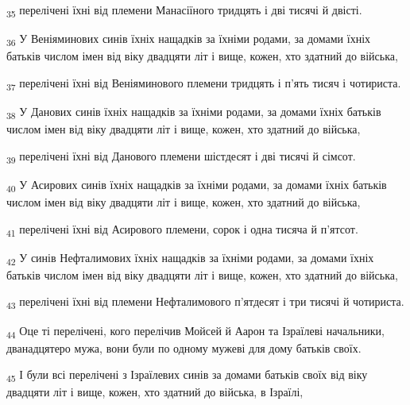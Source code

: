\begin{tcolorbox}
\textsubscript{35} перелічені їхні від племени Манасіїного тридцять і дві тисячі й двісті.
\end{tcolorbox}
\begin{tcolorbox}
\textsubscript{36} У Веніяминових синів їхніх нащадків за їхніми родами, за домами їхніх батьків числом імен від віку двадцяти літ і вище, кожен, хто здатний до війська,
\end{tcolorbox}
\begin{tcolorbox}
\textsubscript{37} перелічені їхні від Веніяминового племени тридцять і п'ять тисяч і чотириста.
\end{tcolorbox}
\begin{tcolorbox}
\textsubscript{38} У Данових синів їхніх нащадків за їхніми родами, за домами їхніх батьків числом імен від віку двадцяти літ і вище, кожен, хто здатний до війська,
\end{tcolorbox}
\begin{tcolorbox}
\textsubscript{39} перелічені їхні від Данового племени шістдесят і дві тисячі й сімсот.
\end{tcolorbox}
\begin{tcolorbox}
\textsubscript{40} У Асирових синів їхніх нащадків за їхніми родами, за домами їхніх батьків числом імен від віку двадцяти літ і вище, кожен, хто здатний до війська,
\end{tcolorbox}
\begin{tcolorbox}
\textsubscript{41} перелічені їхні від Асирового племени, сорок і одна тисяча й п'ятсот.
\end{tcolorbox}
\begin{tcolorbox}
\textsubscript{42} У синів Нефталимових їхніх нащадків за їхніми родами, за домами їхніх батьків числом імен від віку двадцяти літ і вище, кожен, хто здатний до війська,
\end{tcolorbox}
\begin{tcolorbox}
\textsubscript{43} перелічені їхні від племени Нефталимового п'ятдесят і три тисячі й чотириста.
\end{tcolorbox}
\begin{tcolorbox}
\textsubscript{44} Оце ті перелічені, кого перелічив Мойсей й Аарон та Ізраїлеві начальники, дванадцятеро мужа, вони були по одному мужеві для дому батьків своїх.
\end{tcolorbox}
\begin{tcolorbox}
\textsubscript{45} І були всі перелічені з Ізраїлевих синів за домами батьків своїх від віку двадцяти літ і вище, кожен, хто здатний до війська, в Ізраїлі,
\end{tcolorbox}
